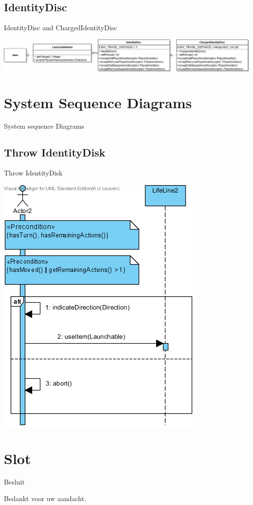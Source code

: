 \documentclass[t]{beamer}
\begin{document}
\subsection{IdentityDisc}
\begin{frame}{IdentityDisc and ChargedIdentityDisc}
\begin{center}
\vspace{0.5in}
\includegraphics[width=1\linewidth]{images/identitydiscs}
\end{center}
\end{frame}
\section{System Sequence Diagrams}

\begin{frame}{System sequence Diagrams}
\begin{multicols}{2}
\tableofcontents[currentsection]
\end{multicols}
\end{frame}
\subsection{Throw IdentityDisk}
\begin{frame}{Throw IdentityDisk}
\begin{center}
\includegraphics[scale=0.5]{images/ChooseDirectionSSD}
\end{center}
\end{frame}


\section{Slot}
\begin{frame}{Besluit}
\vspace{0.8in}
\begin{center}
Bedankt voor uw aandacht.
\end{center}
\end{frame}
\end{document}
